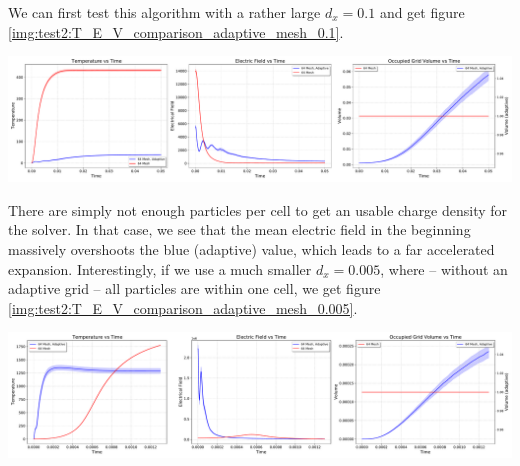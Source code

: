 We can first test this algorithm with a rather large $d_x = 0.1$ and get figure \ref{img:test2:T_E_V_comparison_adaptive_mesh_0.1}. \\
\begin{minipage}[h]{\linewidth}
    \vspace{5pt}
    \centering
    \includegraphics[width=\linewidth]{ressources/test2/T_E_V_comparison_adaptive_mesh_0.1.pdf}
    \label{img:test2:T_E_V_comparison_adaptive_mesh_0.1}
    \vspace{5pt}
\end{minipage}
There are simply not enough particles per cell to get an usable charge density for the solver. In that case, we see that the mean electric field in the beginning massively overshoots the blue (adaptive) value, which leads to a far accelerated expansion. Interestingly, if we use a much smaller $d_x = 0.005$, where -- without an adaptive grid -- all particles are within one cell, we get figure \ref{img:test2:T_E_V_comparison_adaptive_mesh_0.005}. \\
\begin{minipage}[h]{\linewidth}
    \vspace{5pt}
    \centering
    \includegraphics[width=\linewidth]{ressources/test2/T_E_V_comparison_adaptive_mesh_0.005.pdf}
    \label{img:test2:T_E_V_comparison_adaptive_mesh_0.005}
    \vspace{5pt}
\end{minipage}
